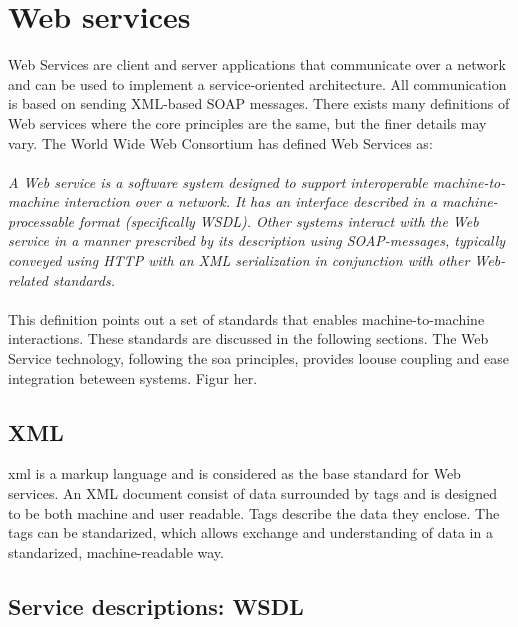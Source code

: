 \documentclass[USenglish]{ifimaster}
\begin{document}
\section{Web services}
\label{web-services}
Web Services are client and server applications that communicate over a network
and can be used to implement a service-oriented architecture. All communication
is based on sending XML-based SOAP messages. There exists many definitions of
Web services where the core principles are the same, but the finer details may
vary. The World Wide Web Consortium has defined Web Services
as\cite{wrc-web-service}:
\paragraph{}
\textit{
    A Web service is a software system designed to support interoperable
    machine-to-machine interaction over a network. It has an interface described in
    a machine-processable format (specifically WSDL). Other systems interact with
    the Web service in a manner prescribed by its description using SOAP-messages,
    typically conveyed using HTTP with an XML serialization in conjunction with
    other Web-related standards.
}

\paragraph{}

This definition points out a set of standards that enables machine-to-machine
interactions. These standards are discussed in the following sections. The Web
Service technology, following the \gls{soa} principles, provides loouse coupling
and ease integration beteween systems. Figur her.


\subsection{XML}

\gls{xml} is a markup language and is considered as the base standard for Web
services. An XML document consist of data surrounded by tags and is designed to
be both machine and user readable. Tags describe the data they enclose. The tags
can be standarized, which allows exchange and understanding of data in a
standarized, machine-readable way.


\subsection{Service descriptions: WSDL}
\end{document}
